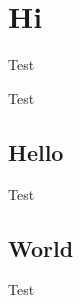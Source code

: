 \chapter{Hi}
\label{cha:intro}

Test\cite{example}

Test

\section{Hello}
\label{sec:context}

Test

\section{World}
\label{sec:problem}

Test